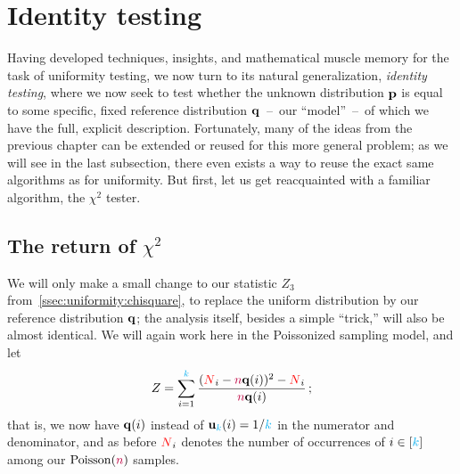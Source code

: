 \section{Identity testing}
  \label{sec:identity}
Having developed techniques, insights, and mathematical muscle memory for the task of uniformity testing, we now turn to its natural generalization, \emph{identity testing}, where we now seek to test whether the unknown distribution $\mathbf{p}$ is equal to some specific, fixed reference distribution $\mathbf{q}$~--~our ``model''~--~of which we have the full, explicit description. Fortunately, many of the ideas from the previous chapter can be extended or reused for this more general problem; as we will see in the last subsection, there even exists a way to reuse the exact same algorithms as for uniformity. But first, let us get reacquainted  with a familiar algorithm, the $\chi^2$ tester.

\subsection{The return of $\chi^2$}
	\label{ssec:chisquare:identity}

We will only make a small change to our statistic $Z_3$ from~\cref{ssec:uniformity:chisquare}, to replace the uniform distribution by our reference distribution $\mathbf{q}$; the analysis itself, besides a simple ``trick,'' will also be almost identical. We will again work here in the Poissonized sampling model, and let
\begin{equation}
  \label{eq:def:z:chisquare:identity}
    Z = \sum_{i=1}^{\textcolor{cyan}{k}} \frac{(\textcolor{red}{N}_i-{\textcolor{purple}{n}}\mathbf{q}(i))^2- \textcolor{red}{N}_i}{{\textcolor{purple}{n}}\mathbf{q}(i)}\,;
\end{equation}
that is, we now have $\mathbf{q}(i)$ instead of $\mathbf{u}_{\textcolor{cyan}{k}}(i)=1/{\textcolor{cyan}{k}}$ in the numerator and denominator, and as before $\textcolor{red}{N}_i$ denotes the number of occurrences of $i\in[{\textcolor{cyan}{k}}]$ among our $\poisson{\ns}$ samples. 

